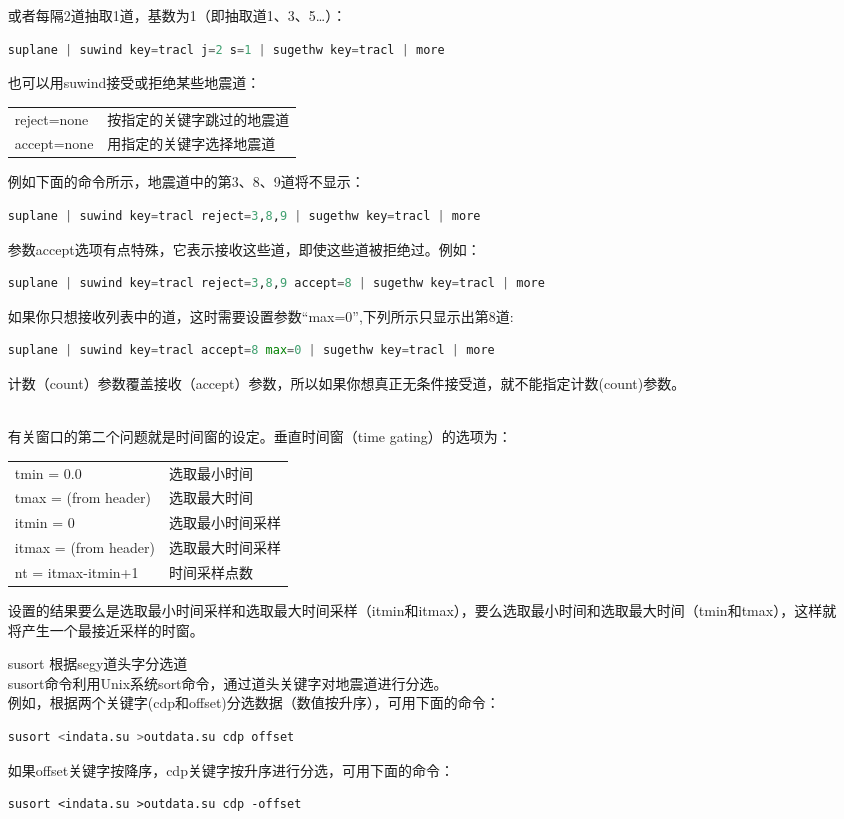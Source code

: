 \begin{enumerate}
	或者每隔2道抽取1道，基数为1（即抽取道1、3、5…）：
\begin{lstlisting}[language=python]	
suplane | suwind key=tracl j=2 s=1 | sugethw key=tracl | more
\end{lstlisting}	
	也可以用suwind接受或拒绝某些地震道：\par
	\mvspace
	\begin{tabular}{ll}
		\toprule
		reject=none  &   按指定的关键字跳过的地震道\\
		accept=none   &   用指定的关键字选择地震道\\
		\bottomrule
	\end{tabular}\par
	\mvspace
	例如下面的命令所示，地震道中的第3、8、9道将不显示：
\begin{lstlisting}[language=python]		
suplane | suwind key=tracl reject=3,8,9 | sugethw key=tracl | more
\end{lstlisting}	
	参数accept选项有点特殊，它表示接收这些道，即使这些道被拒绝过。例如：
\begin{lstlisting}[language=python]	
suplane | suwind key=tracl reject=3,8,9 accept=8 | sugethw key=tracl | more
\end{lstlisting}	
	如果你只想接收列表中的道，这时需要设置参数“max=0”,下列所示只显示出第8道:
\begin{lstlisting}[language=python]	
suplane | suwind key=tracl accept=8 max=0 | sugethw key=tracl | more
\end{lstlisting}	
	计数（count）参数覆盖接收（accept）参数，所以如果你想真正无条件接受道，就不能指定计数(count)参数。\par
	\mvspace
	\\
	有关窗口的第二个问题就是时间窗的设定。垂直时间窗（time gating）的选项为：\\
	\begin{tabular}{ll}
		\toprule
		tmin = 0.0 & 选取最小时间	\\
		tmax = (from header) &  选取最大时间	\\
		itmin = 0 & 选取最小时间采样\\	
		itmax = (from header) & 选取最大时间采样\\	
		nt = itmax-itmin+1 & 时间采样点数	\\
		\bottomrule
	\end{tabular}\par
	\mvspace
	设置的结果要么是选取最小时间采样和选取最大时间采样（itmin和itmax），要么选取最小时间和选取最大时间（tmin和tmax），这样就将产生一个最接近采样的时窗。
	\item[susort] 根据segy道头字分选道\\
	susort命令利用Unix系统sort命令，通过道头关键字对地震道进行分选。\\
	例如，根据两个关键字(cdp和offset)分选数据（数值按升序），可用下面的命令：
\begin{lstlisting}[language=python]	
susort <indata.su >outdata.su cdp offset
\end{lstlisting}
	如果offset关键字按降序，cdp关键字按升序进行分选，可用下面的命令：
\begin{lstlisting}
susort <indata.su >outdata.su cdp -offset
\end{lstlisting}
	

\end{enumerate}
